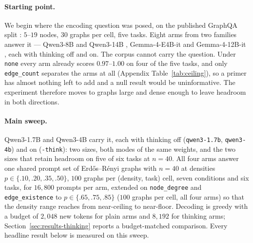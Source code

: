 \documentclass[11pt]{article}
\begin{document}
\paragraph{Starting point.} We begin where the encoding question was posed,
on the published GraphQA split \citep{fatemi2023talklikeagraph}: $5$--$19$
nodes, $30$ graphs per cell, five tasks. Eight arms from two families
answer it --- Qwen3-8B and Qwen3-14B \citep{qwen2025qwen3}, Gemma-4-E4B-it
and Gemma-4-12B-it \citep{gemma4}, each with thinking off and on. The
corpus cannot carry the question. Under \texttt{none} every arm already
scores $0.97$--$1.00$ on four of the five tasks, and only
\texttt{edge\_count} separates the arms at all (Appendix
Table~\ref{tab:ceiling}), so a primer has almost nothing left to add and a
null result would be uninformative. The experiment therefore moves to
graphs large and dense enough to leave headroom in both directions.

\paragraph{Main sweep.} Qwen3-1.7B and Qwen3-4B \citep{qwen2025qwen3}
carry it, each with thinking off (\texttt{qwen3-1.7b}, \texttt{qwen3-4b})
and on (\texttt{-think}): two sizes, both modes of the same weights, and
the two sizes that retain headroom on five of six tasks at $n{=}40$. All
four arms answer one shared prompt set of Erd\H{o}s--R\'enyi graphs
\citep{erdosrenyi1959random} with $n{=}40$ at densities
$p\in\{.10,.20,.35,.50\}$, $100$ graphs per (density, task) cell, seven
conditions and six tasks, for $16{,}800$ prompts per arm, extended on
\texttt{node\_degree} and \texttt{edge\_existence} to
$p\in\{.65,.75,.85\}$ ($100$ graphs per cell, all four arms) so that the
density range reaches from near-ceiling to near-floor. Decoding is greedy
with a budget of $2{,}048$ new tokens for plain arms and $8{,}192$ for
thinking arms; Section~\ref{sec:results-thinking} reports a budget-matched
comparison. Every headline result below is measured on this sweep.
\end{document}
